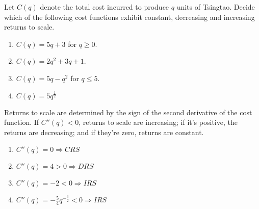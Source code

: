 \documentclass{article}
\newenvironment{solution}{\color{red}}{\color{black}}
\begin{document}
Let $C(q)$ denote the total cost incurred to produce $q$ units of Tsingtao. Decide which of the following cost functions exhibit constant, decreasing and increasing returns to scale.

\begin{enumerate}
\item $C(q) = 5q + 3$ for $q \geq 0$.
\item $C(q) = 2q^2 + 3q + 1$.
\item $C(q) = 5q - q^2$ for $q \leq 5$.
\item $C(q) = 5 q^\frac12$
\end{enumerate}

\begin{solution}
Returns to scale are determined by the sign of the second derivative of the cost function. If $C''(q) < 0$, returns to scale are increasing; if it's positive, the returns are decreasing; and if they're zero, returns are constant.
\begin{enumerate}
\item $C''(q) = 0 \Rightarrow CRS$
\item $C''(q) = 4 > 0 \Rightarrow DRS$
\item $C''(q) = -2 < 0 \Rightarrow IRS$
\item $C''(q) = -\frac54 q^{-\frac32} <0 \Rightarrow IRS$
\end{enumerate}

\end{solution}
\end{document}
